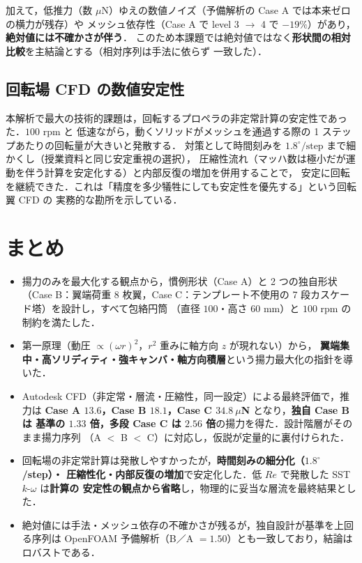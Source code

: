 \documentclass[a4paper,11pt]{jsarticle}
\begin{document}
加えて，低推力（数 $\mu$N）ゆえの数値ノイズ（予備解析の Case A では本来ゼロの横力が残存）や
メッシュ依存性（Case A で level 3 $\to$ 4 で $-19\%$）があり，\textbf{絶対値には不確かさが伴う}．
このため本課題では絶対値ではなく\textbf{形状間の相対比較}を主結論とする（相対序列は手法に依らず
一致した）．

\subsection{回転場 CFD の数値安定性}

本解析で最大の技術的課題は，回転するプロペラの非定常計算の安定性であった．$100$ rpm と
低速ながら，動くソリッドがメッシュを通過する際の 1 ステップあたりの回転量が大きいと発散する．
対策として時間刻みを $1.8^\circ/\mathrm{step}$ まで細かくし（授業資料と同じ安定重視の選択），
圧縮性流れ（マッハ数は極小だが運動を伴う計算を安定化する）と内部反復の増加を併用することで，
安定に回転を継続できた．これは「精度を多少犠牲にしても安定性を優先する」という回転翼 CFD の
実務的な勘所を示している．

\section{まとめ}

\begin{itemize}
  \item 揚力のみを最大化する観点から，慣例形状（Case A）と 2 つの独自形状（Case B：翼端荷重
        8 枚翼，Case C：テンプレート不使用の 7 段カスケード塔）を設計し，すべて包絡円筒
        （直径 $100$・高さ $60$ mm）と $100$ rpm の制約を満たした．
  \item 第一原理（動圧 $\propto(\omega r)^2$，$r^2$ 重みに軸方向 $z$ が現れない）から，
        \textbf{翼端集中・高ソリディティ・強キャンバ・軸方向積層}という揚力最大化の指針を導いた．
  \item Autodesk CFD（非定常・層流・圧縮性，同一設定）による最終評価で，推力は
        \textbf{Case A $13.6$，Case B $18.1$，Case C $34.8\ \mu$N} となり，\textbf{独自 Case B は
        基準の $1.33$ 倍，多段 Case C は $2.56$ 倍}の揚力を得た．設計階層がそのまま揚力序列
        （A $<$ B $<$ C）に対応し，仮説が定量的に裏付けられた．
  \item 回転場の非定常計算は発散しやすかったが，\textbf{時間刻みの細分化（$1.8^\circ$/step）・
        圧縮性化・内部反復の増加}で安定化した．低 $Re$ で発散した SST $k\text{-}\omega$ は\textbf{計算の
        安定性の観点から省略}し，物理的に妥当な層流を最終結果とした．
  \item 絶対値には手法・メッシュ依存の不確かさが残るが，独自設計が基準を上回る序列は OpenFOAM
        予備解析（B／A $=1.50$）とも一致しており，結論はロバストである．
\end{itemize}
\end{document}
